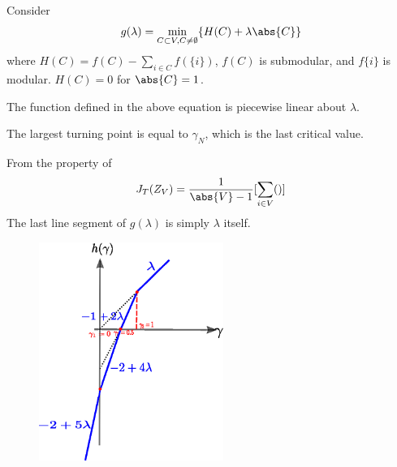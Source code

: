Consider
\begin{equation}
g(\lambda) = \min_{C\subset V, C\neq \emptyset} \{ H(C) + \lambda\abs{C}\}
\end{equation}
where $H(C) = f(C) - \sum_{i\in C} f(\{i\})$, $f(C)$ is submodular, and $f\{i\}$ is modular.
$H(C)=0$ for $\abs{C}=1$.

The function defined in the above equation is piecewise linear about $\lambda$.

The largest turning point is equal to $\gamma_N$, which is the last critical value.

From the property of 
\begin{equation}
J_T(Z_V) = \frac{1}{\abs{V}-1} [\sum_{i \in V}()]
\end{equation}
The last line segment of $g(\lambda)$ is simply $\lambda$ itself.

\begin{figure}[!ht]
\includegraphics[width=6cm]{pic/dt2.eps}
\end{figure}
